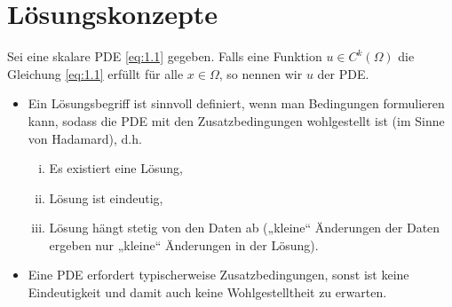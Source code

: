\section{Lösungskonzepte} \label{sec:1.3}

\begin{df} \label{1.18}
	Sei eine skalare PDE \eqref{eq:1.1} gegeben.
	Falls eine Funktion $u \in C^k(\Omega)$ die Gleichung \eqref{eq:1.1} erfüllt für alle $x \in \Omega$, so nennen wir $u$  der PDE.
	\begin{note}[Wohlgestelltheit]
		\begin{itemize}
			\item
				Ein Lösungsbegriff ist sinnvoll definiert, wenn man Bedingungen formulieren kann, sodass die PDE mit den Zusatzbedingungen wohlgestellt ist (im Sinne von Hadamard), d.h.
				\begin{enumerate}[i)]
					\item
						Es existiert eine Lösung,
					\item
						Lösung ist eindeutig,
					\item
						Lösung hängt stetig von den Daten ab („kleine“ Änderungen der Daten ergeben nur „kleine“ Änderungen in der Lösung).
				\end{enumerate}
			\item
				Eine PDE erfordert typischerweise Zusatzbedingungen, sonst ist keine Eindeutigkeit und damit auch keine Wohlgestelltheit zu erwarten.


\end{itemize}
\end{note}
\end{df}
